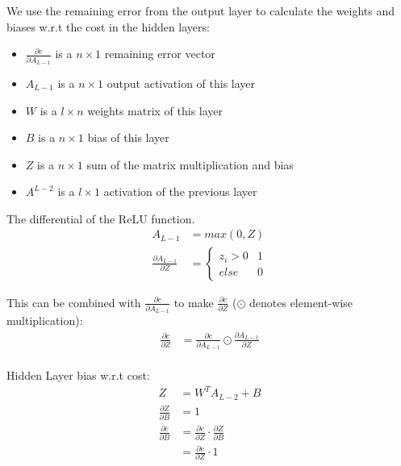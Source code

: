 We use the remaining error from the output layer to calculate the weights and
biases w.r.t the cost in the hidden layers:
\begin{itemize}
    \item \( \frac{\partial c}{\partial A_{L-1}} \) is a \( n \times 1 \) remaining error vector 
    \item \( A_{L-1} \) is a  \( n \times 1 \) output activation of this layer
    \item \( W \) is a \( l \times n \) weights matrix of this layer
    \item \( B \) is a \( n \times 1 \) bias of this layer
    \item \( Z \) is a \( n \times 1 \) sum of the matrix multiplication and bias
    \item \(A^{L-2} \) is a \( l \times 1 \) activation of the previous layer
\end{itemize}
\clearpage
The differential of the ReLU function.
\begin{equation}
    \begin{aligned}
        A_{L-1} &= max(0,Z)\\[2em]
        \frac{\partial A_{L-1}}{\partial Z} &= 
        \begin{cases}
            z_{i} > 0 & 1 \\
            else & 0
        \end{cases}
    \end{aligned}
\end{equation}

This can be combined with \( \frac{\partial c}{\partial A_{L-1}} \) to make \(
\frac{\partial c}{\partial Z} \) (\( \odot \) denotes element-wise
multiplication):
\begin{equation}
    \begin{aligned}
        \frac{\partial c}{\partial Z} &= \frac{\partial c}{\partial A_{L-1}} \odot \frac{\partial A_{L-1}}{\partial Z}\\
    \end{aligned}
\end{equation}

Hidden Layer bias w.r.t cost:
\begin{equation}
    \begin{aligned}
        Z &= W^{T}A_{L-2} + B\\
        \frac{\partial Z}{\partial B} &= 1\\[2em]
        \frac{\partial c}{\partial B} &= \frac{\partial c}{\partial Z} \cdot \frac{\partial Z}{\partial B}\\
                                      &= \frac{\partial c}{\partial Z} \cdot 1
    \end{aligned}
\end{equation}

